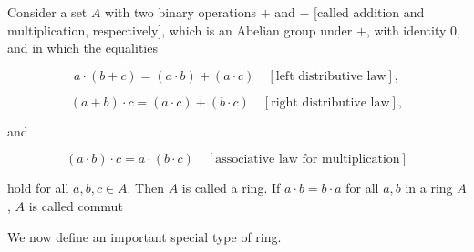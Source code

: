 Consider a set $A$ with two binary operations $+$ and $-$ [called addition and multiplication, respectively], which is an Abelian group under $+$, with identity 0, and in which the equalities

$$a \cdot (b + c) = (a \cdot b) + (a \cdot c) \quad [\text{left distributive law}] ,$$

$$(a + b) \cdot c = (a \cdot c) + (b \cdot c) \quad [\text{right distributive law}] ,$$

and

$$(a \cdot b) \cdot c = a \cdot (b \cdot c) \quad [\text{associative law for multiplication}]$$

hold for all $a, b, c \in A$. Then $A$ is called a ring. If $a \cdot b = b \cdot a$ for all $a, b$ in a ring $A$, $A$ is called commut

We now define an important special type of ring.